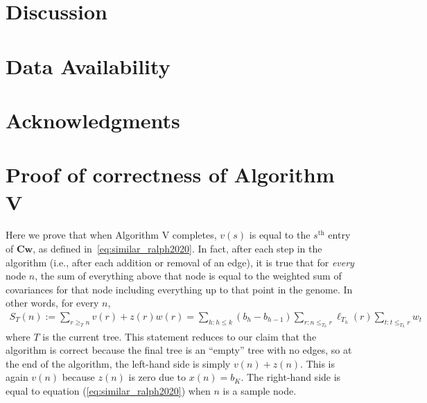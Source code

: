 

\section{Discussion}



\section*{Data Availability}



\section*{Acknowledgments}





\clearpage

\appendix




\setcounter{table}{0}
\setcounter{figure}{0}
\renewcommand{\thetable}{A\arabic{table}}
\renewcommand{\thefigure}{A\arabic{figure}}

\section{Proof of correctness of Algorithm V}\label{sec:proof-algv-correct}

Here we prove that when Algorithm V completes, $v(s)$ is equal to the
$s^{\text{th}}$ entry of $\mathbf{C}\mathbf{w}$, as defined
in~\eqref{eq:similar_ralph2020}.
In fact, after each step in the algorithm (i.e., after each addition or removal of an edge), 
it is true that for \textit{every} node $n$, the sum of everything above that node is equal to the weighted sum of covariances
for that node including everything up to that point in the genome.
In other words, for every $n$,
\begin{align} \label{eqn:matvec_consistent}
    S_T(n):=
    \sum_{r \ge_T n} v(r) + z(r)w(r) 
    = 
    \sum_{h:h \le k} (b_h-b_{h-1}) \sum_{r:n \le_{T_h} r} \ell_{T_h}(r) \sum_{t: t \le_{T_h} r} w_t
\end{align}
where $T$ is the current tree.
This statement reduces to our claim that the algorithm is correct because
the final tree is an ``empty'' tree with no edges,
so at the end of the algorithm, the left-hand side is simply $v(n)+z(n)$.
This is again $v(n)$ because $z(n)$ is zero due to $x(n)=b_K$.
The right-hand side is equal to equation 
(\ref{eq:similar_ralph2020}) when $n$ is a sample node.

